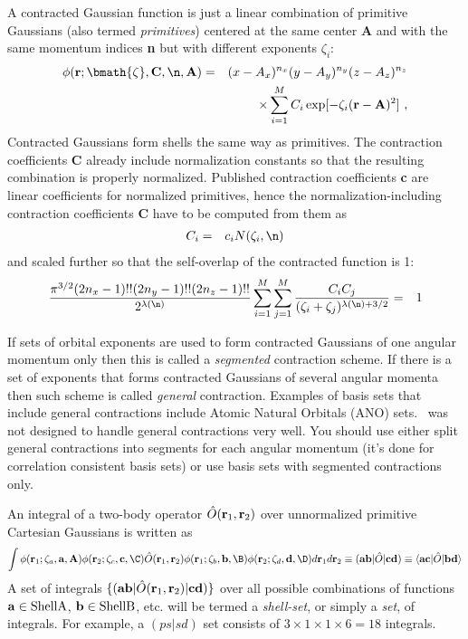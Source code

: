 \documentclass[10pt]{article}
\providecommand{\braket}[1]{\ensuremath{\langle #1 \rangle}}
\begin{document}
A contracted Gaussian function is just a linear combination of primitive Gaussians (also termed {\em primitives})
centered at the same center {\bf A} and with the same momentum indices {\bf n}
but with different exponents $\zeta_i$:
\begin{eqnarray}
\phi ({\bf r}; \bmath{\zeta}, {\bf C}, \n, {\bf A}) & = & (x - A_x)^{n_x} (y - A_y)^{n_y} (z - A_z)^{n_z} \nonumber \\
& & \times \sum_{i=1}^M C_i \exp [-\zeta_i ({\bf r}-{\bf A})^2]\ ,
\end{eqnarray}
Contracted Gaussians form shells the same way as primitives.
The contraction coefficients {\bf C} already include normalization constants so that the resulting combination
is properly normalized. Published contraction coefficients {\bf c} are linear coefficients for normalized primitives,
hence the normalization-including contraction coefficients {\bf C} have to be computed from them as
\begin{eqnarray} \label{eq:C1}
C_i & = & c_i N(\zeta_i,\n)
\end{eqnarray}
and scaled further so that the self-overlap of the contracted function is 1:
\begin{eqnarray} \label{eq:C2}
\frac{\pi^{3/2} (2n_x-1)!!(2n_y-1)!!(2n_z-1)!!}{2^{\lambda(\n)}}
\sum_{i=1}^M \sum_{j=1}^M \frac{C_i C_j }{(\zeta_i+\zeta_j)^{\lambda(\n)+3/2}} & = & 1
\end{eqnarray}

If sets of orbital exponents are used to form contracted Gaussians of one angular momentum only
then this is called a {\em segmented} contraction scheme. If there is a set of exponents that forms
contracted Gaussians of several angular momenta then such scheme is called {\em general} contraction.
Examples of basis sets that include general contractions include Atomic Natural Orbitals (ANO) sets.
\LIBINT\ was not designed to handle general contractions very well. You should use either split general contractions
into segments for each angular momentum (it's done for correlation consistent basis sets)
or use basis sets with segmented contractions only.

An integral of a two-body operator $\hat{O}({\bf r}_1, {\bf r}_2)$ over unnormalized
primitive Cartesian Gaussians is written as
\begin{eqnarray}
\int \phi({\bf r}_1; \zeta_a, {\bf a}, {\bf A}) \phi ({\bf r}_2; \zeta_c, {\bf c}, \C) \hat{O}({\bf r}_1, {\bf r}_2)
\phi({\bf r}_1; \zeta_b, {\bf b}, \B) \phi({\bf r}_2; \zeta_d, {\bf d}, \D)
d{\bf r}_1 d{\bf r}_2 \equiv ({\bf ab} |\hat{O}|{\bf cd}) \equiv \braket{ {\bf
ac} | \hat{O} | {\bf bd} }
\end{eqnarray}
A set of integrals $\{ ({\bf a} {\bf b}|\hat{O}({\bf r}_1, {\bf r}_2)|{\bf c} {\bf d}) \}$
over all possible combinations of functions ${\bf a} \in {\rm Shell A}$, ${\bf b} \in {\rm Shell B}$, etc.
will be termed a {\em shell-set}, or simply a {\em set}, of integrals. For example, a $(ps|sd)$ set consists of
$3 \times 1 \times 1 \times 6 = 18$ integrals.
\end{document}
